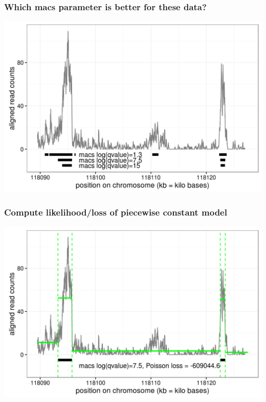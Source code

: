 \documentclass{beamer}
\DeclareMathOperator*{\PoissonLoss}{PoissonLoss}
\newcommand{\RR}{\mathbb R}
\newcommand{\ZZ}{\mathbb Z}
\begin{document}
\begin{frame}
  \frametitle{Which macs parameter is better for these data?}
  \includegraphics[width=1\textwidth]{figure-macs-problem.png}
\end{frame}


\begin{frame}
  \frametitle{Compute likelihood/loss of piecewise constant model}
  \includegraphics[width=1\textwidth]{figure-macs-problem-7-5.png}
\end{frame}
\end{document}
